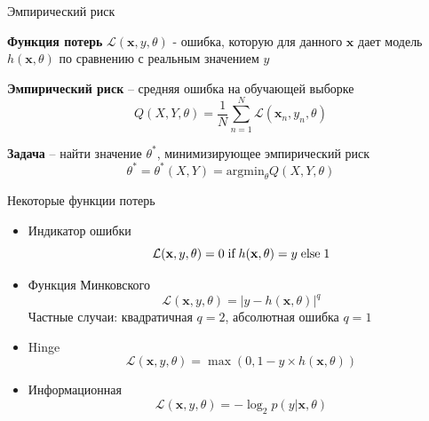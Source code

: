 \documentclass[10pt]{beamer}
\begin{document}
\begin{frame}{Эмпирический риск}

{\bf Функция потерь} $\mathcal{L}(\mathbf{x}, y, \theta)$ - ошибка, которую для данного $\mathbf{x}$ дает модель $h(\mathbf{x}, \theta)$ по сравнению с реальным значением $y$
\vspace{1em}

{\bf Эмпирический риск} -- средняя ошибка на обучающей выборке
\[
Q(X, Y, \theta) = \frac{1}{N} \sum_{n=1}^N \mathcal{L}(\mathbf{x}_n, y_n, \theta)
\]
\vspace{1em}

{\bf Задача} -- найти значение $\theta^*$, минимизирующее эмпирический риск
\[
\theta^* = \theta^*(X, Y) = \text{argmin}_\theta Q(X, Y, \theta)
\]

\end{frame}

\begin{frame}{Некоторые функции потерь}

\begin{itemize}
\item Индикатор ошибки
\[
\mathcal{L}(\mathbf{x}, y, \theta) = 0 \text{\;if\;} h(\mathbf{x}, \theta) = y \text{\;else\;} 1
\]
\item Функция Минковского 
\[
\mathcal{L}(\mathbf{x}, y, \theta) = |y - h(\mathbf{x}, \theta)|^q
\]
Частные случаи: квадратичная $q = 2$, абсолютная ошибка $q = 1$
\item Hinge
\[
\mathcal{L}(\mathbf{x}, y, \theta) = \max(0, 1 - y \times h(\mathbf{x}, \theta))
\]
\item Информационная
\[
\mathcal{L}(\mathbf{x}, y, \theta) = - \log_2 p(y | \mathbf{x}, \theta)
\]
\begin{center}

\end{center}
\end{itemize}

\end{frame}
\end{document}
